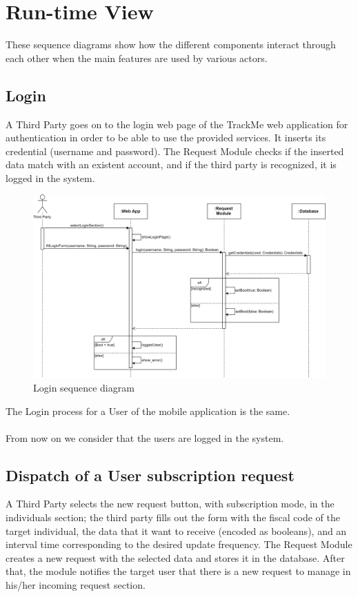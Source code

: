 \section{Run-time View}
These sequence diagrams show how the different components interact through each other when the main features are used by various actors.
\subsection{Login}
A Third Party goes on to the login web page of the TrackMe web application for authentication in order to be able to use the provided services. It inserts its credential (username and password). The Request Module checks if the inserted data match with an existent account, and if the third party is recognized, it is logged in the system.

\begin{figure}[H]
    \centering
    \includegraphics[scale=0.15]{./Pictures/login.png}
    \caption{Login sequence diagram}
\end{figure}

The Login process for a User of the mobile application is the same.\\ \\
From now on we consider that the users are logged in the system.

\subsection{Dispatch of a User subscription request}
A Third Party selects the new request button, with subscription mode, in the individuals section; the third party fills out the form with the fiscal code of the target individual, the data that it want to receive (encoded as booleans), and an interval time corresponding to the desired update frequency. The Request Module creates a new request with the selected data and stores it in the database. After that, the module notifies the target user that there is a new request to manage in his/her incoming request section.

